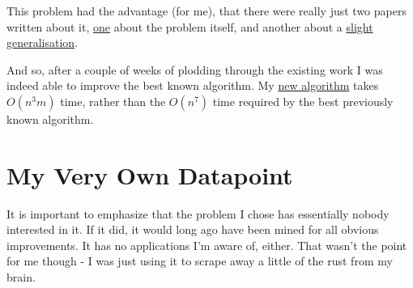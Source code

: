 \documentclass[11pt]{article}
\begin{document}
\begin{figure}[ht]
\end{figure}

This problem had the advantage (for me), that there were really just two papers written about it, \href{https://doi.org/10.1016/j.ipl.2007.12.003}{one} about the problem itself, and another about a
\href{https://doi.org/10.1142/S1793830911001243}{slight generalisation}.

And so, after a couple of weeks of plodding through the existing work I was indeed able to improve the best known algorithm. My \href{https://doi.org/10.7155/jgaa.v30i1.3137}{new algorithm} takes $O(n^3 m)$ time, rather
than the $O(n^7)$ time required by the best previously known algorithm.

\section{My Very Own Datapoint}

It is important to emphasize that the problem I chose has essentially nobody interested in it. If it did, it would long ago have been mined for all obvious improvements. It has no applications I'm aware of, either.
That wasn't the point for me though - I was just using it to scrape away a little of the rust from my brain.
\end{document}
